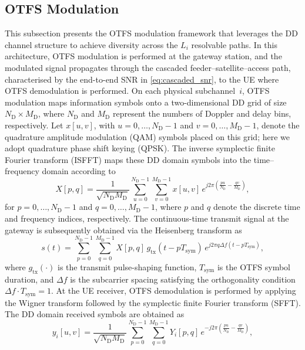 \documentclass[lettersize,journal]{IEEEtran}
\begin{document}
\subsection{OTFS Modulation}
\label{sec:otfs}
 This subsection presents the OTFS modulation framework that leverages the DD channel structure to achieve diversity across the $L_i$ resolvable paths. In this architecture, OTFS modulation is performed at the gateway station, and the modulated signal propagates through the cascaded feeder--satellite--access path, characterised by the end-to-end SNR in \eqref{eq:cascaded_snr}, to the UE where OTFS demodulation is performed. On each physical subchannel~$i$, OTFS modulation maps information symbols onto a two-dimensional DD grid of size $N_{\mathrm{D}} \times M_{\mathrm{D}}$, where $N_{\mathrm{D}}$ and $M_{\mathrm{D}}$ represent the numbers of Doppler and delay bins, respectively. Let $x[u,v]$, with $u = 0,\ldots,N_{\mathrm{D}}-1$ and $v = 0,\ldots,M_{\mathrm{D}}-1$, denote the quadrature amplitude modulation (QAM) symbols placed on this grid; here we adopt quadrature phase shift keying (QPSK).  The inverse symplectic finite Fourier transform (ISFFT) maps these DD domain symbols into the time--frequency domain according to
\begin{equation}
X[p,q] = \frac{1}{\sqrt{N_{\mathrm{D}}M_{\mathrm{D}}}} \sum_{u=0}^{N_{\mathrm{D}}-1} \sum_{v=0}^{M_{\mathrm{D}}-1} x[u,v]\, e^{j2\pi\left(\frac{pu}{N_{\mathrm{D}}} - \frac{qv}{M_{\mathrm{D}}}\right)},
\label{eq:isfft}
\end{equation}
for $p = 0,\ldots,N_{\mathrm{D}}-1$ and $q = 0,\ldots,M_{\mathrm{D}}-1$, where $p$ and $q$ denote the discrete time and frequency indices, respectively. The continuous-time transmit signal at the gateway is subsequently obtained via the Heisenberg transform as
\begin{equation}
s(t) = \sum_{p=0}^{N_{\mathrm{D}}-1} \sum_{q=0}^{M_{\mathrm{D}}-1} X[p,q]\,g_{\mathrm{tx}}(t-pT_{\mathrm{sym}})\, e^{j2\pi q \Delta f (t-pT_{\mathrm{sym}})},
\label{eq:tx_signal}
\end{equation}
where $g_{\mathrm{tx}}(\cdot)$ is the transmit pulse-shaping function, $T_{\mathrm{sym}}$ is the OTFS symbol duration, and $\Delta f$ is the subcarrier spacing satisfying the orthogonality condition $\Delta f \cdot T_{\mathrm{sym}} = 1$. At the UE receiver, OTFS demodulation is performed by applying the Wigner transform followed by the symplectic finite Fourier transform (SFFT). The DD domain received symbols are obtained as
\begin{equation}
y_{i}[u,v] = \frac{1}{\sqrt{N_{\mathrm{D}}M_{\mathrm{D}}}} \sum_{p=0}^{N_{\mathrm{D}}-1} \sum_{q=0}^{M_{\mathrm{D}}-1} Y_{i}[p,q]\, e^{-j2\pi\left(\frac{pu}{N_{\mathrm{D}}} - \frac{qv}{M_{\mathrm{D}}}\right)},
\label{eq:sfft}
\end{equation}
\end{document}
